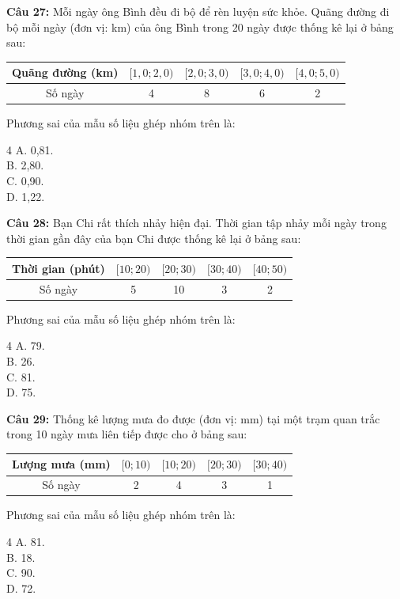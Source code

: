 \documentclass[12pt]{article}
\begin{document}
	\noindent \textbf{Câu 27:} Mỗi ngày ông Bình đều đi bộ để rèn luyện sức khỏe. Quãng đường đi bộ mỗi ngày (đơn vị: km) của ông Bình trong 20 ngày được thống kê lại ở bảng sau:
	\begin{center}
		\renewcommand{\arraystretch}{1.3}
		\begin{tabular}{|c|c|c|c|c|}
			\hline
			Quãng đường (km) & $[1,0; 2,0)$ & $[2,0; 3,0)$ & $[3,0; 4,0)$ & $[4,0; 5,0)$ \\
			\hline
			Số ngày & 4 & 8 & 6 & 2 \\
			\hline
		\end{tabular}
	\end{center}
	Phương sai của mẫu số liệu ghép nhóm trên là:
	\begin{multicols}{4}
		A. 0,81. \\
		B. 2,80. \\
		C. 0,90. \\
		D. 1,22.
	\end{multicols}
	
	\vspace{4mm}
	
	\noindent \textbf{Câu 28:} Bạn Chi rất thích nhảy hiện đại. Thời gian tập nhảy mỗi ngày trong thời gian gần đây của bạn Chi được thống kê lại ở bảng sau:
	\begin{center}
		\renewcommand{\arraystretch}{1.3}
		\begin{tabular}{|c|c|c|c|c|}
			\hline
			Thời gian (phút) & $[10; 20)$ & $[20; 30)$ & $[30; 40)$ & $[40; 50)$ \\
			\hline
			Số ngày & 5 & 10 & 3 & 2 \\
			\hline
		\end{tabular}
	\end{center}
	Phương sai của mẫu số liệu ghép nhóm trên là:
	\begin{multicols}{4}
		A. 79. \\
		B. 26. \\
		C. 81. \\
		D. 75.
	\end{multicols}
	
	\vspace{4mm}
	
	\noindent \textbf{Câu 29:} Thống kê lượng mưa đo được (đơn vị: mm) tại một trạm quan trắc trong 10 ngày mưa liên tiếp được cho ở bảng sau:
	\begin{center}
		\renewcommand{\arraystretch}{1.3}
		\begin{tabular}{|c|c|c|c|c|}
			\hline
			Lượng mưa (mm) & $[0; 10)$ & $[10; 20)$ & $[20; 30)$ & $[30; 40)$ \\
			\hline
			Số ngày & 2 & 4 & 3 & 1 \\
			\hline
		\end{tabular}
	\end{center}
	Phương sai của mẫu số liệu ghép nhóm trên là:
	\begin{multicols}{4}
		A. 81. \\
		B. 18. \\
		C. 90. \\
		D. 72.
	\end{multicols}
	
\end{document}
